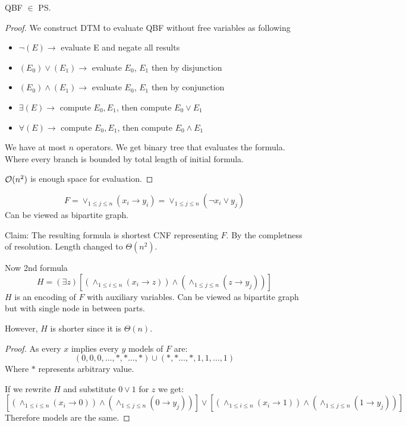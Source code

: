 \begin{theorem}[QBF $\in$ PS]
	QBF $\in$ PS.
\end{theorem}
\begin{proof}
	We construct DTM to evaluate QBF without free variables as following
	\begin{itemize}
		\item $\neg(E) \to$ evaluate E and negate all results
		\item $(E_0) \lor (E_1) \to $ evaluate $E_0$, $E_1$ then by disjunction
		\item $(E_0) \land (E_1) \to $ evaluate $E_0$, $E_1$ then by conjunction
		\item $\exists (E) \to$ compute $E_0, E_1$, then compute $E_0 \lor E_1$
		\item $\forall(E) \to$ compute $E_0, E_1$, then compute $E_0 \land E_1$
	\end{itemize}

	We have at most $n$ operators.
	We get binary tree that evaluates the formula.
	Where every branch is bounded by total length of initial formula.

	$\mathcal{O}(n^2)$ is enough space for evaluation.
\end{proof}

\begin{example}
	\[ F = \vee_{1 \leq j \leq n} (x_i \to y_i) = \vee_{1 \leq j \leq n} (\neg x_i \lor y_j)\]
	Can be viewed as bipartite graph.

	Claim: The resulting formula is shortest CNF representing $F$.
	By the completness of resolution.
	Length changed to $\Theta(n^2)$.

	Now 2nd formula
	\[ H = (\exists z) [(\wedge_{1 \leq i \leq n}(x_i \to z)) \land (\wedge_{1 \leq j \leq n} (z \to y_j))] \]
	$H$ is an encoding of $F$ with auxiliary variables.
	Can be viewed as bipartite graph but with single node in between parts.

	However, $H$ is shorter since it is $\Theta(n)$.
\end{example}
\begin{proof}
	As every $x$ implies every $y$ models of $F$ are:
	\[ (0, 0, 0, \ldots, *, * \ldots, *) \cup (*, * \ldots, *, 1, 1, \ldots, 1)\]
	Where $*$ represents arbitrary value.

	If we rewrite $H$ and substitute $0 \lor 1$ for $z$ we get:
	\[ [(\wedge_{1 \leq i \leq n}(x_i \to 0)) \land (\wedge_{1 \leq j \leq n}(0 \to y_j))] \lor [(\wedge_{1 \leq i \leq n}(x_i \to 1)) \land (\wedge_{1 \leq j \leq n}(1 \to y_j))]\]
	Therefore models are the same.
\end{proof}

